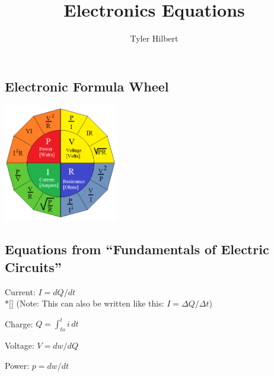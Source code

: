 \documentclass{article}
\newcommand{\forceindent}{\leavevmode{\parindent=3em\indent}}
\begin{document}
	\title{Electronics Equations}
	\author{Tyler Hilbert}
	\date{}
	\maketitle

	\subsection*{Electronic Formula Wheel}
	\includegraphics[width=50mm]{FormulaWheel.png}

	\subsection*{Equations from ``Fundamentals of Electric Circuits''}

	Current: $I = dQ/dt$ \\*[\smallskipamount]
	\forceindent (Note: This can also be written like this: $I = \Delta Q / \Delta t$)
	
	Charge: $Q = \int_{to}^{t} i\,dt$

	Voltage: $V = dw/dQ$

	Power: $p = dw/dt$
	
	
\end{document}
